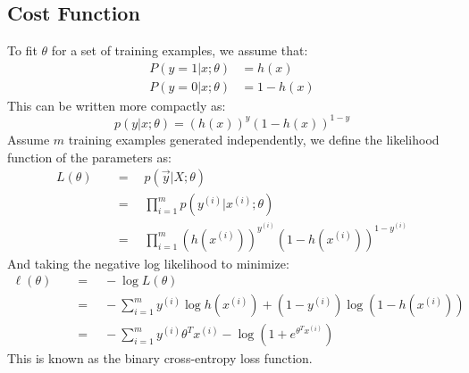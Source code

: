 \documentclass[twoside,twocolumn]{article}
\begin{document}
\subsection{Cost Function}
To fit $\theta$ for a set of training examples, we assume that:
\begin{equation}
  \begin{aligned}
    P ( y = 1 | x ; \theta ) & = h( x ) \\
    P ( y = 0 | x ; \theta ) & = 1 - h( x )
  \end{aligned}
\end{equation}
This can be written more compactly as:
\begin{equation}
  p ( y | x ; \theta ) = \left( h ( x ) \right) ^ { y } \left( 1 - h ( x ) \right) ^ { 1 - y }
\end{equation}
Assume $m$ training examples generated independently, we define the likelihood
function of the parameters as:
\begin{equation}
  \begin{aligned}
    L ( \theta ) \quad & = \quad p \left( \vec{y} | X ; \theta \right) \\
    & = \quad \prod _ { i = 1 } ^ { m } p \left( y ^ { ( i ) } | x ^ { ( i ) } ; \theta \right) \\
    & = \quad \prod _ { i = 1 } ^ { m } \left( h \left( x ^ { ( i ) } \right) \right) ^ { y ^ { ( i ) } } \left( 1 - h  \left( x ^ { ( i ) } \right) \right) ^ { 1 - y ^ { ( i ) } }
  \end{aligned}
\end{equation}
And taking the negative log likelihood to minimize:
\begin{equation}
  \begin{aligned}
    \ell ( \theta ) \quad & = \quad -\log L ( \theta ) \\
    & = \quad -\sum _ { i = 1 } ^ { m } y ^ { ( i ) } \log h \left( x ^ { ( i ) } \right) + \left( 1 - y ^ { ( i ) } \right) \log \left( 1 - h \left( x ^ { ( i ) } \right) \right) \\
    & = \quad -\sum_{i=1}^{m} y^{(i)} \theta^T x^{(i)} - \log \left( 1 + e^{\theta^T x^{(i)}} \right)
  \end{aligned}
\end{equation}
This is known as the binary cross-entropy loss function.
\end{document}
